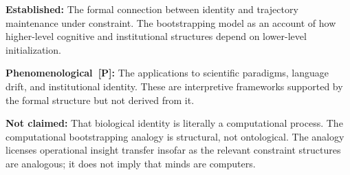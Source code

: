 \begin{constraintboundary}
\textbf{Established:} The formal connection between identity and trajectory
maintenance under constraint. The bootstrapping model as an account of how
higher-level cognitive and institutional structures depend on lower-level
initialization.

\textbf{Phenomenological~[P]:} The applications to scientific paradigms,
language drift, and institutional identity. These are interpretive frameworks
supported by the formal structure but not derived from it.

\textbf{Not claimed:} That biological identity is literally a computational
process. The computational bootstrapping analogy is structural, not ontological.
The analogy licenses operational insight transfer insofar as the relevant
constraint structures are analogous; it does not imply that minds are computers.
\end{constraintboundary}
